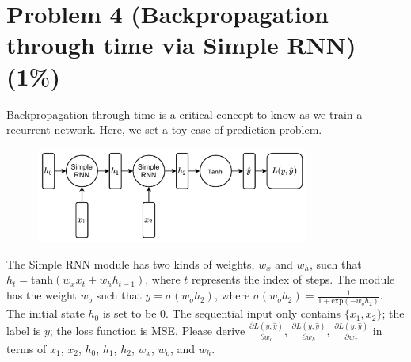 \documentclass{article}
\begin{document}
\section*{Problem 4 (Backpropagation through time via Simple RNN)(1\%)}
Backpropagation through time is a critical concept to know as we train a recurrent network. Here, we set a toy case of prediction problem. 
\begin{figure}[h]
    \centering
    \includegraphics[width=0.8\textwidth]{RNN.png}
\end{figure}
The Simple RNN module has two kinds of weights, $w_x$ and $w_h$, such that $h_t = \text{tanh}(w_xx_t + w_hh_{t-1})$, where $t$ represents the index of steps. The module has the weight $w_o$ such that $\hat{y} = \sigma(w_o h_2)$, where $\sigma(w_oh_2) = \frac{1}{1+\text{exp}(-w_o h_2)}$. The initial state $h_0$ is set to be $0$. The sequential input only contains $\{x_1, x_2\}$; the label is $y$; the loss function is MSE. Please derive $\frac{\partial L(y, \hat{y})}{\partial w_o}$, $\frac{\partial L(y, \hat{y})}{\partial w_h}$, $\frac{\partial L(y, \hat{y})}{\partial w_x}$ in terms of $x_1$, $x_2$, $h_0$, $h_1$, $h_2$, $w_x$, $w_o$, and $w_h$.
\end{document}
